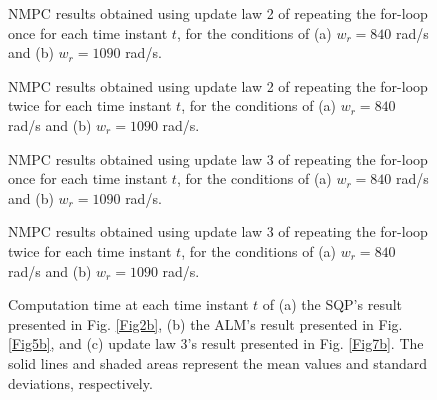 \documentclass[journal]{IEEEtranTIE}
\begin{document}
\begin{figure}[!t]
\centering
{}
\vfill
{}
\caption{NMPC results obtained using update law 2 of repeating the for-loop once for each time instant $t$, for the conditions of (a) $w_r = 840$ rad/s  and (b) $w_r = 1090$ rad/s.
}\label{Fig7}
\end{figure}

\begin{figure}[!t]
\centering
{}
\vfill
{}
\caption{NMPC results obtained using update law 2 of repeating the for-loop twice for each time instant $t$, for the conditions of (a) $w_r = 840$ rad/s  and (b) $w_r = 1090$ rad/s.
}\label{Fig8}
\end{figure}

\begin{figure}[!t]
\centering
{}
\vfill
{}
\caption{NMPC results obtained using update law 3 of repeating the for-loop once for each time instant $t$, for the conditions of (a) $w_r = 840$ rad/s  and (b) $w_r = 1090$ rad/s.
}\label{Fig_UpdateLaw3_OneIteration}
\end{figure}

\begin{figure}[!t]
\centering
{}
\vfill
{}
\caption{NMPC results obtained using update law 3 of repeating the for-loop twice for each time instant $t$, for the conditions of (a) $w_r = 840$ rad/s  and (b) $w_r = 1090$ rad/s.
}\label{Fig_UpdateLaw3_TwoIterations}
\end{figure}

\begin{figure}[!t]
\centering
{}
\vfill
{}
\vfill
{}
\caption{Computation time at each time instant $t$ of (a) the SQP's result presented in Fig. \ref{Fig2b}, (b) the ALM's result presented in Fig. \ref{Fig5b}, and (c) update law 3's result presented in Fig. \ref{Fig7b}. The solid lines and shaded areas represent the mean values and standard deviations, respectively.
}\label{Fig9}
\end{figure}
\end{document}

